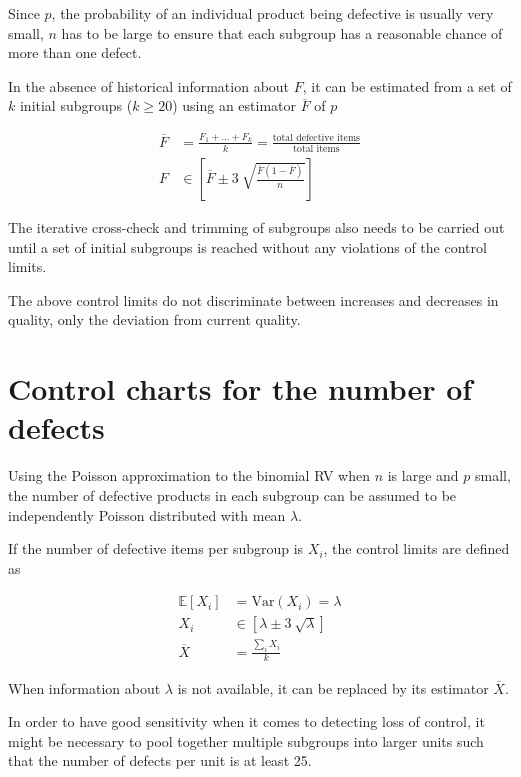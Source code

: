 Since $ p $, the probability of an individual product being defective is usually very small, $ n $ has to be large to ensure that each subgroup has a reasonable chance of more than one defect.

In the absence of historical information about $ F $, it can be estimated from a set of $ k $ initial subgroups ($ k \geq 20 $) using an estimator $ \overline{F} $ of $ p $

\begin{align}
	\overline{F} &= \frac{F_1 + \dots + F_k}{k} = \frac{\text{total defective items}}{\text{total items}} \\
	F &\in \left[\overline{F} \pm 3\ \sqrt{\frac{\overline{F}(1-\overline{F})}{n}}\right]
\end{align}

The iterative cross-check and trimming of subgroups also needs to be carried out until a set of initial subgroups is reached without any violations of the control limits.

The above control limits do not discriminate between increases and decreases in quality, only the deviation from current quality.

\section{Control charts for the number of defects}


Using the Poisson approximation to the binomial RV when $ n $ is large and $ p $ small, the number of defective products in each subgroup can be assumed to be independently Poisson distributed with mean $ \lambda $. 


If the number of defective items per subgroup is $ X_i $, the control limits are defined as

\begin{align}
	\mathbb{E}[X_i] &= \mathrm{Var}(X_i) = \lambda \\
	X_i &\in \left[ \lambda \pm 3\ \sqrt{\lambda} \right] \\
	\overline{X} &= \frac{\sum_i X_i}{k}
\end{align} 

When information about $ \lambda $ is not available, it can be replaced by its estimator $ \overline{X} $. 

In order to have good sensitivity when it comes to detecting loss of control, it might be necessary to pool together multiple subgroups into larger units such that the number of defects per unit is at least 25.


